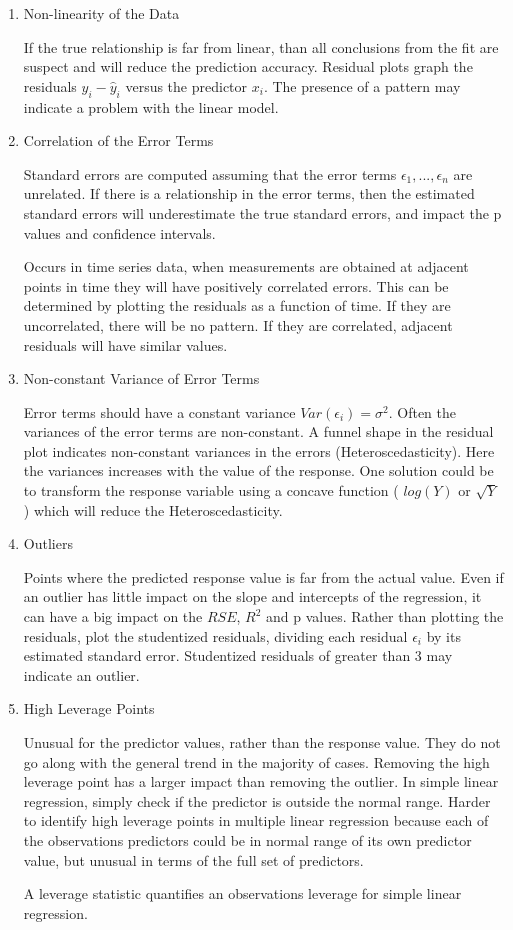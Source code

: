 \documentclass[
]{article}
\begin{document}
\begin{enumerate}
\def\labelenumi{\arabic{enumi}.}
\item
  Non-linearity of the Data

  If the true relationship is far from linear, than all conclusions from
  the fit are suspect and will reduce the prediction accuracy. Residual
  plots graph the residuals \(y_i - \hat{y}_i\) versus the predictor
  \(x_i\). The presence of a pattern may indicate a problem with the
  linear model.
\item
  Correlation of the Error Terms

  Standard errors are computed assuming that the error terms
  \(\epsilon_1,...,\epsilon_n\) are unrelated. If there is a
  relationship in the error terms, then the estimated standard errors
  will underestimate the true standard errors, and impact the p values
  and confidence intervals.

  Occurs in time series data, when measurements are obtained at adjacent
  points in time they will have positively correlated errors. This can
  be determined by plotting the residuals as a function of time. If they
  are uncorrelated, there will be no pattern. If they are correlated,
  adjacent residuals will have similar values.
\item
  Non-constant Variance of Error Terms

  Error terms should have a constant variance
  \(Var(\epsilon_i) = \sigma^2\). Often the variances of the error terms
  are non-constant. A funnel shape in the residual plot indicates
  non-constant variances in the errors (Heteroscedasticity). Here the
  variances increases with the value of the response. One solution could
  be to transform the response variable using a concave function (
  \(log(Y)\) or \(\sqrt{Y}\) ) which will reduce the Heteroscedasticity.
\item
  Outliers

  Points where the predicted response value is far from the actual
  value. Even if an outlier has little impact on the slope and
  intercepts of the regression, it can have a big impact on the \(RSE\),
  \(R^2\) and p values. Rather than plotting the residuals, plot the
  studentized residuals, dividing each residual \(\epsilon_i\) by its
  estimated standard error. Studentized residuals of greater than 3 may
  indicate an outlier.
\item
  High Leverage Points

  Unusual for the predictor values, rather than the response value. They
  do not go along with the general trend in the majority of cases.
  Removing the high leverage point has a larger impact than removing the
  outlier. In simple linear regression, simply check if the predictor is
  outside the normal range. Harder to identify high leverage points in
  multiple linear regression because each of the observations predictors
  could be in normal range of its own predictor value, but unusual in
  terms of the full set of predictors.

  A leverage statistic quantifies an observations leverage for simple
  linear regression.
\end{enumerate}
\end{document}
